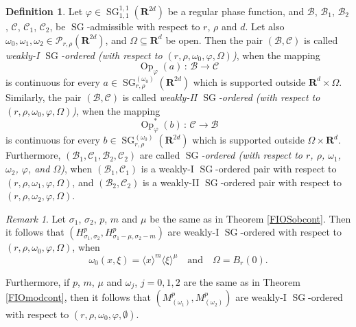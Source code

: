 \documentclass[12pt,a4paper,reqno]{amsart}
\numberwithin{equation}{section}
\numberwithin{thm}{section}
\theoremstyle{definition}
\newtheorem{defn}[thm]{Definition}
\theoremstyle{remark}
\newtheorem{rem}[thm]{Remark}
\begin{document}
\begin{defn}\label{admspacesdef}
Let ${\varphi} \in {\operatorname{SG}} ^{1,1}_{1,1}({\mathbf R^{{2d}}})$ be a regular phase function,
and ${{\mathcal B}}$, ${{\mathcal B}}_1$, ${{\mathcal B}}_2$, ${{\mathcal C}}$, ${{\mathcal C}}_1$, ${{\mathcal C}}_2$, be
${\operatorname{SG}}$-admissible with respect to $r$, $\rho$ and $d$. Let also $\omega _0,\omega_1,\omega_2\in
\mathscr P_{r,\rho}({\mathbf R^{{2d}}})$, and $\Omega \subseteq {\mathbf R^{d}}$ be open. Then
the pair $({{\mathcal B}} ,{{\mathcal C}} )$ is called \emph{weakly-I ${\operatorname{SG}}$-ordered (with respect to
$(r,\rho ,\omega _0,\varphi ,\Omega )$)}, when the mapping
$$
{\operatorname{Op}}_\varphi(a)\, :\, {{\mathcal B}} \to {{\mathcal C}}
$$
is continuous for every $a\in {\operatorname{SG}} ^{(\omega _0)}_{r,\rho}({\mathbf R^{{2d}}})$ which is
supported outside ${\mathbf R^{d}}\times \Omega$. Similarly, the pair $({{\mathcal B}} ,{{\mathcal C}} )$ is called 
\emph{weakly-II ${\operatorname{SG}}$-ordered (with respect to
$(r,\rho ,\omega _0,\varphi ,\Omega )$)}, when the mapping
$$
{\operatorname{Op}}_\varphi^*(b)\, :\, {{\mathcal C}} \to {{\mathcal B}}
$$
is continuous for every $b\in {\operatorname{SG}} ^{(\omega _0)}_{r,\rho}({\mathbf R^{{2d}}})$
which is supported outside $\Omega\times{\mathbf R^{d}}$. Furthermore,
$({{\mathcal B}}_1, {{\mathcal C}}_1, {{\mathcal B}}_2, {{\mathcal C}}_2)$ are called \emph{${\operatorname{SG}}$-ordered
(with respect to $r$, $\rho$, $\omega _1$, $\omega_2$, $\varphi$,
and $\Omega$)}, when $({{\mathcal B}}_1,{{\mathcal C}}_1)$ is a weakly-I 
${\operatorname{SG}}$-ordered pair with respect to
$(r,\rho ,\omega _1,\varphi ,\Omega )$, and
$({{\mathcal B}}_2,{{\mathcal C}}_2)$ is a weakly-II 
${\operatorname{SG}}$-ordered pair with respect to
$(r,\rho ,\omega _2,\varphi ,\Omega )$.
\end{defn}

\par

\begin{rem}\label{remSGadm}
Let $\sigma _1$, $\sigma _2$, $p$, $m$ and $\mu$ be the same as in
Theorem \ref{FIOSobcont}. Then it follows that
$(H^p_{\sigma _1,\sigma _2},H^p_{\sigma_1-\mu,\sigma_2-m})$
are weakly-I ${\operatorname{SG}}$-ordered with respect to
$(r,\rho ,\omega _0,\varphi ,\Omega )$, when
$$
\omega _0(x,\xi) = {\langle x\rangle}^{m}{\langle \xi\rangle} ^{\mu}\quad
\text{and}\quad \Omega = B_r(0).
$$

\par

\noindent
Furthermore, if $p$, $m$, $\mu$
and $\omega _j$, $j=0,1,2$ are the same as in Theorem
\ref{FIOmodcont}, then it follows that
$(M^p_{(\omega _1)},M^p_{(\omega _2)})$ are weakly-I
${\operatorname{SG}}$-ordered with respect to $(r,\rho ,\omega _0,\varphi ,\emptyset )$.
\end{rem}
\end{document}
